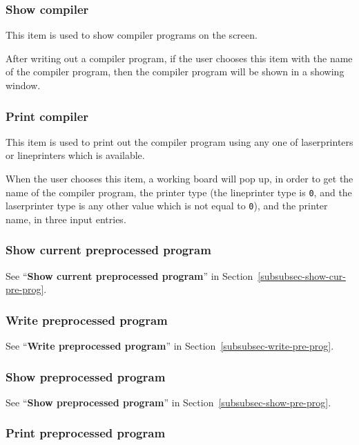 \begin{sloppypar}
\subsubsection{Show compiler}


This item is used to show compiler programs on the screen.

   After writing out a compiler program, if the user chooses this item
with the name of the compiler program, then the compiler program will
be shown in a showing window.



\subsubsection{Print compiler}


This item is used to print out the compiler program using any one of
laserprinters or lineprinters which is available.

   When the user chooses this item, a working board will pop up, in
order to get the name of the compiler program, the printer type (the
lineprinter type is {\tt 0}, and the laserprinter type is any other
value which is not equal to {\tt 0}), and the printer name, in three
input entries.


\subsubsection{Show current preprocessed program}

See ``{\bf Show current preprocessed program}'' in
Section~\ref{subsubsec-show-cur-pre-prog}.

\subsubsection{Write preprocessed program}

See ``{\bf Write preprocessed program}'' in
Section~\ref{subsubsec-write-pre-prog}.

\subsubsection{Show preprocessed program}

See ``{\bf Show preprocessed program}'' in
Section~\ref{subsubsec-show-pre-prog}.

\subsubsection{Print preprocessed program}


\end{sloppypar}
